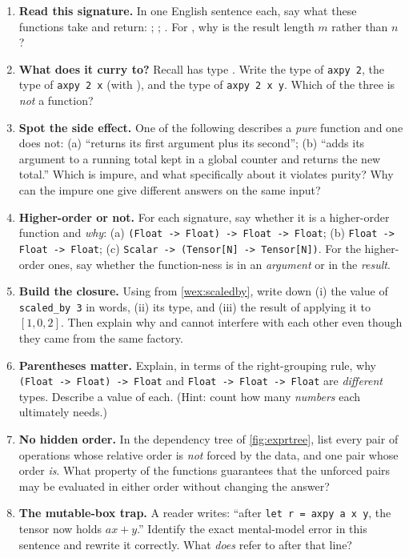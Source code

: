 \exercisessection
\begin{enumerate}[nosep]
  \item \textbf{Read this signature.} In one English sentence each, say what these
  functions take and return:
  ;
  ;
  .
  For , why is the result length $m$ rather than $n$?
  \item \textbf{What does it curry to?} Recall  has type
  .
  Write the type of \lstinline[style=l4style]|axpy 2|, the type of
  \lstinline[style=l4style]|axpy 2 x| (with ), and the type of
  \lstinline[style=l4style]|axpy 2 x y|. Which of the three is \emph{not} a
  function?
  \item \textbf{Spot the side effect.} One of the following describes a
  \emph{pure} function and one does not: (a) ``returns its first argument plus its
  second''; (b) ``adds its argument to a running total kept in a global counter
  and returns the new total.'' Which is impure, and what specifically about it
  violates purity? Why can the impure one give different answers on the same
  input?
  \item \textbf{Higher-order or not.} For each signature, say whether it is a
  higher-order function and \emph{why}: (a)
  \lstinline[style=l4style]|(Float -> Float) -> Float -> Float|; (b)
  \lstinline[style=l4style]|Float -> Float -> Float|; (c)
  \lstinline[style=l4style]|Scalar -> (Tensor[N] -> Tensor[N])|. For the
  higher-order ones, say whether the function-ness is in an \emph{argument} or in
  the \emph{result}.
  \item \textbf{Build the closure.} Using  from
  \cref{wex:scaledby}, write down (i) the value of
  \lstinline[style=l4style]|scaled_by 3| in words, (ii) its type, and (iii) the
  result of applying it to $[1, 0, 2]$. Then explain why  and
   cannot interfere with each other even though they came from
  the same factory.
  \item \textbf{Parentheses matter.} Explain, in terms of the right-grouping rule,
  why \lstinline[style=l4style]|(Float -> Float) -> Float| and
  \lstinline[style=l4style]|Float -> Float -> Float| are \emph{different} types.
  Describe a value of each. (Hint: count how many \emph{numbers} each ultimately
  needs.)
  \item \textbf{No hidden order.} In the dependency tree of \cref{fig:exprtree},
  list every pair of operations whose relative order is \emph{not} forced by the
  data, and one pair whose order \emph{is}. What property of the functions
  guarantees that the unforced pairs may be evaluated in either order without
  changing the answer?
  \item \textbf{The mutable-box trap.} A reader writes: ``after
  \lstinline[style=l4style]|let r = axpy a x y|, the tensor  now holds
  $a x + y$.'' Identify the exact mental-model error in this sentence and rewrite
  it correctly. What \emph{does}  refer to after that line?
\end{enumerate}
